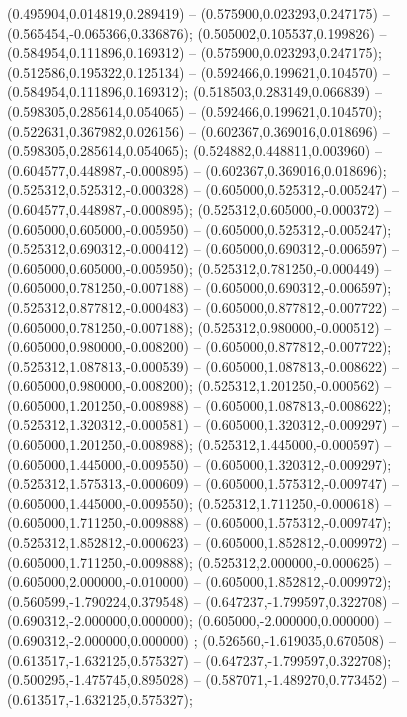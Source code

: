  (0.495904,0.014819,0.289419) -- (0.575900,0.023293,0.247175) -- (0.565454,-0.065366,0.336876);
 (0.505002,0.105537,0.199826) -- (0.584954,0.111896,0.169312) -- (0.575900,0.023293,0.247175);
 (0.512586,0.195322,0.125134) -- (0.592466,0.199621,0.104570) -- (0.584954,0.111896,0.169312);
 (0.518503,0.283149,0.066839) -- (0.598305,0.285614,0.054065) -- (0.592466,0.199621,0.104570);
 (0.522631,0.367982,0.026156) -- (0.602367,0.369016,0.018696) -- (0.598305,0.285614,0.054065);
 (0.524882,0.448811,0.003960) -- (0.604577,0.448987,-0.000895) -- (0.602367,0.369016,0.018696);
 (0.525312,0.525312,-0.000328) -- (0.605000,0.525312,-0.005247) -- (0.604577,0.448987,-0.000895);
 (0.525312,0.605000,-0.000372) -- (0.605000,0.605000,-0.005950) -- (0.605000,0.525312,-0.005247);
 (0.525312,0.690312,-0.000412) -- (0.605000,0.690312,-0.006597) -- (0.605000,0.605000,-0.005950);
 (0.525312,0.781250,-0.000449) -- (0.605000,0.781250,-0.007188) -- (0.605000,0.690312,-0.006597);
 (0.525312,0.877812,-0.000483) -- (0.605000,0.877812,-0.007722) -- (0.605000,0.781250,-0.007188);
 (0.525312,0.980000,-0.000512) -- (0.605000,0.980000,-0.008200) -- (0.605000,0.877812,-0.007722);
 (0.525312,1.087813,-0.000539) -- (0.605000,1.087813,-0.008622) -- (0.605000,0.980000,-0.008200);
 (0.525312,1.201250,-0.000562) -- (0.605000,1.201250,-0.008988) -- (0.605000,1.087813,-0.008622);
 (0.525312,1.320312,-0.000581) -- (0.605000,1.320312,-0.009297) -- (0.605000,1.201250,-0.008988);
 (0.525312,1.445000,-0.000597) -- (0.605000,1.445000,-0.009550) -- (0.605000,1.320312,-0.009297);
 (0.525312,1.575313,-0.000609) -- (0.605000,1.575312,-0.009747) -- (0.605000,1.445000,-0.009550);
 (0.525312,1.711250,-0.000618) -- (0.605000,1.711250,-0.009888) -- (0.605000,1.575312,-0.009747);
 (0.525312,1.852812,-0.000623) -- (0.605000,1.852812,-0.009972) -- (0.605000,1.711250,-0.009888);
 (0.525312,2.000000,-0.000625) -- (0.605000,2.000000,-0.010000) -- (0.605000,1.852812,-0.009972);
 (0.560599,-1.790224,0.379548) -- (0.647237,-1.799597,0.322708) -- (0.690312,-2.000000,0.000000);
 (0.605000,-2.000000,0.000000) -- (0.690312,-2.000000,0.000000) ;
 (0.526560,-1.619035,0.670508) -- (0.613517,-1.632125,0.575327) -- (0.647237,-1.799597,0.322708);
 (0.500295,-1.475745,0.895028) -- (0.587071,-1.489270,0.773452) -- (0.613517,-1.632125,0.575327);
